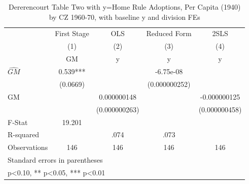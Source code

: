 \begin{table}[htbp]\centering
\def\sym#1{\ifmmode^{#1}\else\(^{#1}\)\fi}
\caption{Dererencourt Table Two with y=Home Rule Adoptions, Per Capita (1940) by CZ 1960-70, with baseline y and division FEs}
\begin{tabular}{l*{4}{c}}
\toprule
                    & First Stage   &         OLS   &Reduced Form   &        2SLS   \\
                    &\multicolumn{1}{c}{(1)}&\multicolumn{1}{c}{(2)}&\multicolumn{1}{c}{(3)}&\multicolumn{1}{c}{(4)}\\
                    &\multicolumn{1}{c}{GM}&\multicolumn{1}{c}{y}&\multicolumn{1}{c}{y}&\multicolumn{1}{c}{y}\\
\midrule
$\hat{GM}$          &       0.539***&               &   -6.75e-08   &               \\
                    &    (0.0669)   &               &(0.000000252)   &               \\
\addlinespace
GM                  &               & 0.000000148   &               &-0.000000125   \\
                    &               &(0.000000263)   &               &(0.000000458)   \\
\midrule
F-Stat              &      19.201   &               &               &               \\
R-squared           &               &        .074   &        .073   &               \\
Observations        &         146   &         146   &         146   &         146   \\
\bottomrule
\multicolumn{5}{l}{\footnotesize Standard errors in parentheses}\\
\multicolumn{5}{l}{\footnotesize * p<0.10, ** p<0.05, *** p<0.01}\\
\end{tabular}
\end{table}
